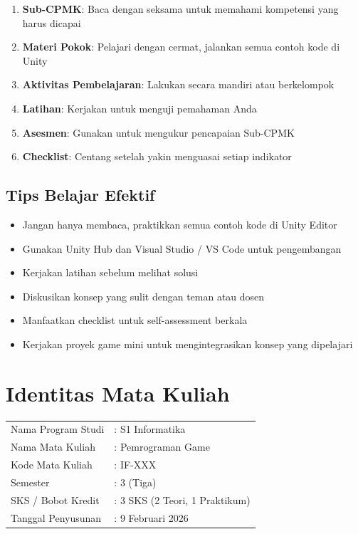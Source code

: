 \begin{enumerate}
  \item \textbf{Sub-CPMK}: Baca dengan seksama untuk memahami kompetensi yang harus dicapai
  \item \textbf{Materi Pokok}: Pelajari dengan cermat, jalankan semua contoh kode di Unity
  \item \textbf{Aktivitas Pembelajaran}: Lakukan secara mandiri atau berkelompok
  \item \textbf{Latihan}: Kerjakan untuk menguji pemahaman Anda
  \item \textbf{Asesmen}: Gunakan untuk mengukur pencapaian Sub-CPMK
  \item \textbf{Checklist}: Centang setelah yakin menguasai setiap indikator
\end{enumerate}

\section*{Tips Belajar Efektif}

\begin{itemize}
  \item Jangan hanya membaca, praktikkan semua contoh kode di Unity Editor
  \item Gunakan Unity Hub dan Visual Studio / VS Code untuk pengembangan
  \item Kerjakan latihan sebelum melihat solusi
  \item Diskusikan konsep yang sulit dengan teman atau dosen
  \item Manfaatkan checklist untuk self-assessment berkala
  \item Kerjakan proyek game mini untuk mengintegrasikan konsep yang dipelajari
\end{itemize}

\cleardoublepage

\chapter*{Identitas Mata Kuliah}

\begin{tabular}{ll}
  Nama Program Studi & : S1 Informatika \\
  Nama Mata Kuliah & : Pemrograman Game \\
  Kode Mata Kuliah & : IF-XXX \\
  Semester & : 3 (Tiga) \\
  SKS / Bobot Kredit & : 3 SKS (2 Teori, 1 Praktikum) \\
  Tanggal Penyusunan & : 9 Februari 2026 \\
\end{tabular}

